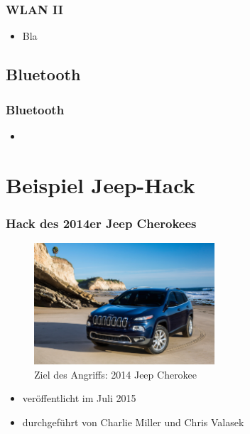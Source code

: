 \documentclass[t]{beamer}
\begin{document}
 \begin{frame}
	\frametitle{WLAN II}
    \begin{itemize}
		\item Bla
        \end{itemize}
\end{frame}

 \begin{frame}
	\frametitle{WLAN III}
    \begin{itemize}
		\item Bla
    \end{itemize}
    }]{wlan-pwd.c}

\end{frame}

\subsection{Bluetooth} %

\begin{frame}
	\frametitle{Bluetooth}
    \begin{itemize}
		\item
    \end{itemize}
\end{frame}

\section{Beispiel Jeep-Hack}
\begin{frame}
	\frametitle{Hack des 2014er Jeep Cherokees}
	\begin{figure}
        \includegraphics[width=0.6\textwidth]{pic/2014-jeep-cherokee-1.jpg} %
        \caption{Ziel des Angriffs: 2014 Jeep Cherokee}
    \end{figure}
    \begin{itemize}
		\item veröffentlicht im Juli 2015
        \item durchgeführt von Charlie Miller und Chris Valasek
	\end{itemize}
\end{frame}
\end{document}
